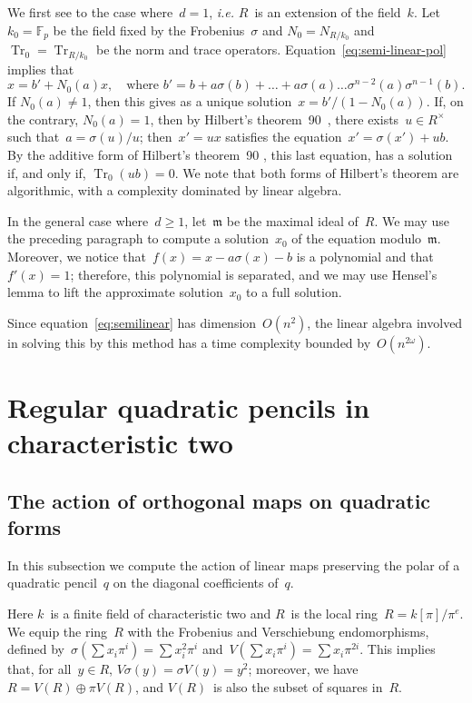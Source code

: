 \documentclass{amsart}
\let\fr\mathfrak
\DeclareMathOperator\Tr{Tr}
\def\F{\mathbb{F}}
\begin{document}
We first see to the case where~$d = 1$, \emph{i.e.} $R$~is an extension
of the field~$k$. Let~$k_0 = \F_p$ be the field fixed by the
Frobenius~$σ$ and $N_0 = N_{R/k_0}$ and~$\Tr_0 = \Tr_{R/k_0}$ be the
norm and trace operators. Equation~\eqref{eq:semi-linear-pol} implies
that
\begin{equation}
x = b' + N_0(a) x, \quad\text{where $b' = b + a σ(b) + … + a σ(a) …
σ^{n-2}(a) σ^{n-1}(b)$.}
\end{equation}
If $N_0(a) ≠ 1$, then this gives as a unique solution~$x =
b'/(1-N_0(a))$. If, on the contrary, $N_0(a) = 1$, then by
Hilbert's theorem~90~\cite[VI.6.1]{lang-algebra3},
there exists~$u ∈ R^{×}$ such that~$a = σ(u)/u$;
then~$x' = ux$ satisfies the equation~$x' = σ(x') + ub$.
By the additive form of Hilbert's theorem~90 \cite[VI.6.3]{lang-algebra3},
this last equation, has a solution if, and only if, $\Tr_0 (ub) = 0$.
We note that both forms of Hilbert's theorem are algorithmic,
with a complexity dominated by linear algebra.

In the general case where~$d ≥ 1$, let~$\fr m$ be the maximal ideal
of~$R$. We may use the preceding paragraph to compute a solution~$x_0$ of
the equation modulo~$\fr m$. Moreover, we notice that~$f(x) = x -  a σ(x)
- b$ is a polynomial and that~$f'(x) = 1$; therefore, this polynomial is
separated, and we may use Hensel's lemma to lift the approximate
solution~$x_0$ to a full solution.

\medskip
Since equation~\eqref{eq:semilinear} has dimension~$O(n^2)$,
the linear algebra involved in solving this by this method
has a time complexity bounded by~$O(n^{2ω})$.

\section{Regular quadratic pencils in characteristic two}
\label{S:quad-reg}
\subsection{The action of orthogonal maps on quadratic forms}

In this subsection we compute the action of linear maps
preserving the polar of a quadratic pencil~$q$
on the diagonal coefficients of~$q$.

Here $k$~is a finite field of characteristic two
and $R$~is the local ring~$R = k[π]/π^e$.
We equip the ring~$R$ with the Frobenius and Verschiebung endomorphisms,
defined by~$σ(∑ x_i π^i) = ∑ x_i^2 π^i$ and~$V(∑ x_i π^i) = ∑ x_i π^{2i}$.
This implies that, for all~$y ∈ R$, $V σ(y) = σ V(y) = y^2$;
moreover, we have~$R = V(R) ⊕ π V(R)$,
and $V(R)$~is also the subset of squares in~$R$.
\end{document}
